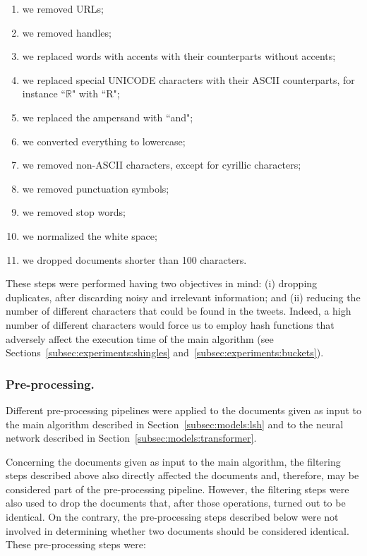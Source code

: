 \documentclass[runningheads]{llncs}
\begin{document}
\begin{enumerate}
  \item we removed URLs;
  \item we removed handles;
  \item we replaced words with accents with their counterparts without accents;
  \item we replaced special UNICODE characters with their ASCII counterparts, for instance “$\mathbb{R}$" with “R";
  \item we replaced the ampersand with “and";
  \item we converted everything to lowercase;
  \item we removed non-ASCII characters, except for cyrillic characters;
  \item we removed punctuation symbols;
  \item we removed stop words;
  \item we normalized the white space;
  \item we dropped documents shorter than 100 characters.
\end{enumerate}

These steps were performed having two objectives in mind: (i) dropping duplicates, after discarding noisy and irrelevant information; and (ii) reducing the number of different characters that could be found in the tweets. Indeed, a high number of different characters would force us to employ hash functions that adversely affect the execution time of the main algorithm (see Sections~\ref{subsec:experiments:shingles} and~\ref{subsec:experiments:buckets}).
 
\subsubsection{Pre-processing.} Different pre-processing pipelines were applied to the documents given as input to the main algorithm described in Section~\ref{subsec:models:lsh} and to the neural network described in Section~\ref{subsec:models:transformer}.

Concerning the documents given as input to the main algorithm, the filtering steps described above also directly affected the documents and, therefore, may be considered part of the pre-processing pipeline. However, the filtering steps were also used to drop the documents that, after those operations, turned out to be identical. On the contrary, the pre-processing steps described below were not involved in determining whether two documents should be considered identical. These pre-processing steps were:
\end{document}
